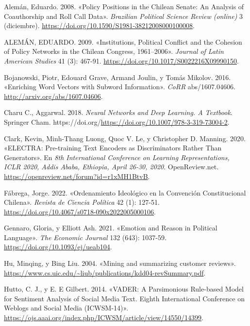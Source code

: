 \documentclass[
  12pt,
]{article}
\newlength{\cslhangindent}
\newlength{\cslentryspacingunit} %
\newenvironment{CSLReferences}[2] %
 {%
  \setlength{\parindent}{0pt}
  \ifodd #1
  \let\oldpar\par
  \def\par{\hangindent=\cslhangindent\oldpar}
  \fi
  \setlength{\parskip}{#2\cslentryspacingunit}
 }%
 {}
\begin{document}
\hypertarget{refs}{}
\begin{CSLReferences}{1}{0}
\leavevmode{}%
Alemán, Eduardo. 2008. {«Policy Positions in the Chilean Senate: An
Analysis of Coauthorship and Roll Call Data»}. \emph{Brazilian Political
Science Review (online)} 3 (diciembre).
\url{https://doi.org/10.1590/S1981-38212008000100008}.

\leavevmode{}%
ALEMÁN, EDUARDO. 2009. {«Institutions, Political Conflict and the
Cohesion of Policy Networks in the Chilean Congress, 1961--2006»}.
\emph{Journal of Latin American Studies} 41 (3): 467-91.
\url{https://doi.org/10.1017/S0022216X09990150}.

\leavevmode{}%
Bojanowski, Piotr, Edouard Grave, Armand Joulin, y Tomás Mikolov. 2016.
{«Enriching Word Vectors with Subword Information»}. \emph{CoRR}
abs/1607.04606. \url{http://arxiv.org/abs/1607.04606}.

\leavevmode{}%
Charu C., Aggarwal. 2018. \emph{Neural Networks and Deep Learning. A
Textbook}. Springer Cham.
https://doi.org/\url{https://doi.org/10.1007/978-3-319-73004-2}.

\leavevmode{}%
Clark, Kevin, Minh-Thang Luong, Quoc V. Le, y Christopher D. Manning.
2020. {«{ELECTRA:} Pre-training Text Encoders as Discriminators Rather
Than Generators»}. En \emph{8th International Conference on Learning
Representations, {ICLR} 2020, Addis Ababa, Ethiopia, April 26-30, 2020}.
OpenReview.net. \url{https://openreview.net/forum?id=r1xMH1BtvB}.

\leavevmode{}%
Fábrega, Jorge. 2022. {«Ordenamiento Ideológico en la Convención
Constitucional Chilena»}. \emph{Revista de Ciencia Política} 42 (1):
127-51. \url{https://doi.org/10.4067/s0718-090x2022005000106}.

\leavevmode{}%
Gennaro, Gloria, y Elliott Ash. 2021. {«{Emotion and Reason in Political
Language}»}. \emph{The Economic Journal} 132 (643): 1037-59.
\url{https://doi.org/10.1093/ej/ueab104}.

\leavevmode{}%
Hu, Minqing, y Bing Liu. 2004. {«Mining and summarizing customer
reviews»}.
\url{https://www.cs.uic.edu/~liub/publications/kdd04-revSummary.pdf}.

\leavevmode{}%
Hutto, C. J., y E. E Gilbert. 2014. {«VADER: A Parsimonious Rule-based
Model for Sentiment Analysis of Social Media Text. Eighth International
Conference on Weblogs and Social Media (ICWSM-14)»}.
\url{https://ojs.aaai.org/index.php/ICWSM/article/view/14550/14399}.


\end{CSLReferences}
\end{document}

